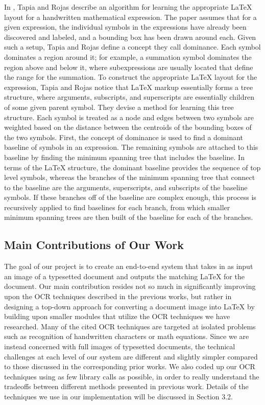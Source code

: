 \documentclass[10pt]{IEEEtran}
\newcommand{\latex}{\LaTeX\xspace}
\begin{document}
In \cite{4}, Tapia and Rojas describe an algorithm for learning the appropriate \latex layout for a handwritten mathematical expression. The paper assumes that for a given expression, the individual symbols in the expressions have already been discovered and labeled, and a bounding box has been drawn around each. Given such a setup, Tapia and Rojas define a concept they call dominance. Each symbol dominates a region around it; for example, a summation symbol dominates the region above and below it, where subexpressions are usually located that define the range for the summation. To construct the appropriate \latex layout for the expression, Tapia and Rojas notice that \latex markup essentially forms a tree structure, where arguments, subscripts, and superscripts are essentially children of some given parent symbol. They devise a method for learning this tree structure. Each symbol is treated as a node and edges between two symbols are weighted based on the distance between the centroids of the bounding boxes of the two symbols. First, the concept of dominance is used to find a dominant baseline of symbols in an expression. The remaining symbols are attached to this baseline by finding the minimum spanning tree that includes the baseline. In terms of the \latex structure, the dominant baseline provides the sequence of top level symbols, whereas the branches of the minimum spanning tree that connect to the baseline are the arguments, superscripts, and subscripts of the baseline symbols. If these branches off of the baseline are complex enough, this process is recursively applied to find baselines for each branch, from which smaller minimum spanning trees are then built of the baseline for each of the branches.

\subsection{Main Contributions of Our Work}

The goal of our project is to create an end-to-end system that takes in as input an image of a typesetted document and outputs the matching \latex for the document. Our main contribution resides not so much in significantly improving upon the OCR techniques described in the previous works, but rather in designing a top-down approach for converting a document image into \latex by building upon smaller modules that utilize the OCR techniques we have researched. Many of the cited OCR techniques are targeted at isolated problems such as recognition of handwritten characters or math equations. Since we are instead concerned with full images of typesetted documents, the technical challenges at each level of our system are different and slightly simpler compared to those discussed in the corresponding prior works. We also coded up our OCR techniques using as few library calls as possible, in order to really understand the tradeoffs between different methods presented in previous work. Details of the techniques we use in our implementation will be discussed in Section 3.2.
\end{document}
